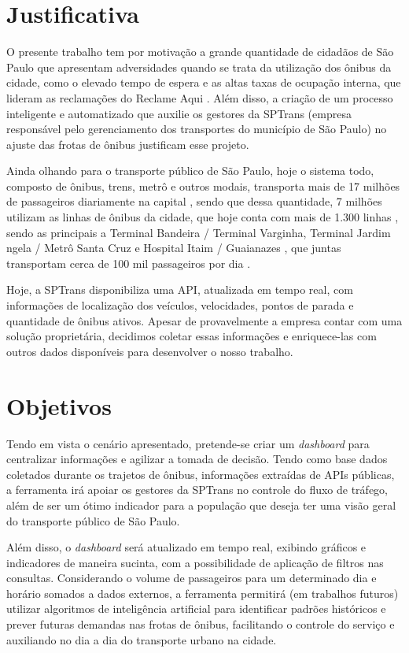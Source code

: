 \section{Justificativa}
\indent
\par O presente trabalho tem por motivação a grande quantidade de cidadãos de São Paulo que apresentam adversidades quando se trata da utilização dos ônibus da cidade, como o elevado tempo de espera e as altas taxas de ocupação interna, que lideram as reclamações do Reclame Aqui \cite{ReclameAqui1} \cite{ReclameAqui2}. Além disso, a criação de um processo inteligente e automatizado que auxilie os gestores da SPTrans (empresa responsável pelo gerenciamento dos transportes do município de São Paulo) no ajuste das frotas de ônibus justificam esse projeto.
\par Ainda olhando para o transporte público de São Paulo, hoje o sistema todo, composto de ônibus, trens, metrô e outros modais, transporta mais de 17 milhões de passageiros diariamente na capital \cite{G1SaoPaulo}, sendo que dessa quantidade, 7 milhões utilizam as linhas de ônibus da cidade, que hoje conta com mais de 1.300 linhas \cite{MobilidadeSampa}, sendo as principais a Terminal Bandeira / Terminal Varginha, Terminal Jardim  ngela / Metrô Santa Cruz e Hospital Itaim / Guaianazes , que juntas transportam cerca de 100 mil passageiros por dia \cite{Viatrolebus}.
\par Hoje, a SPTrans disponibiliza uma API, atualizada em tempo real, com informações de localização dos veículos, velocidades, pontos de parada e quantidade de ônibus ativos. Apesar de provavelmente a empresa contar com uma solução proprietária, decidimos coletar essas informações e enriquece-las com outros dados disponíveis para desenvolver o nosso trabalho.

\section{Objetivos}
\indent
\par Tendo em vista o cenário apresentado, pretende-se criar um \textit{dashboard} para centralizar informações e agilizar a tomada de decisão. Tendo como base dados coletados durante os trajetos de ônibus, informações extraídas de APIs públicas,  a ferramenta irá apoiar os gestores da SPTrans no controle do fluxo de tráfego, além de ser um ótimo indicador para a população que deseja ter uma visão geral do transporte público de São Paulo. 
\par Além disso, o \textit{dashboard} será atualizado em tempo real, exibindo gráficos e indicadores de maneira sucinta, com a possibilidade de aplicação de filtros nas consultas. Considerando o volume de passageiros para um determinado dia e horário somados a dados externos, a ferramenta permitirá (em trabalhos futuros) utilizar algoritmos de inteligência artificial para identificar padrões históricos e prever futuras demandas nas frotas de ônibus, facilitando o controle do serviço e auxiliando no dia a dia do transporte urbano na cidade.

